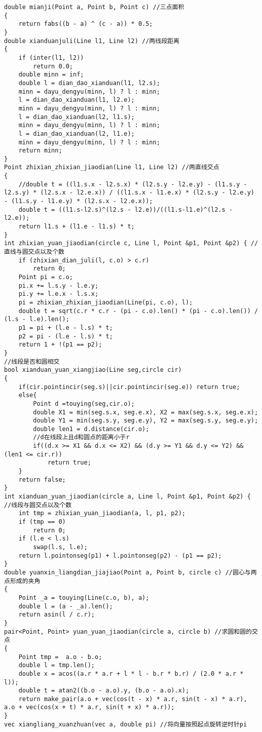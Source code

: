 \begin{lstlisting}
double mianji(Point a, Point b, Point c) //三点面积
{
	return fabs((b - a) ^ (c - a)) * 0.5;
}
double xianduanjuli(Line l1, Line l2) //两线段距离
{
	if (inter(l1, l2))
		return 0.0;
	double minn = inf;
	double l = dian_dao_xianduan(l1, l2.s);
	minn = dayu_dengyu(minn, l) ? l : minn;
	l = dian_dao_xianduan(l1, l2.e);
	minn = dayu_dengyu(minn, l) ? l : minn;
	l = dian_dao_xianduan(l2, l1.s);
	minn = dayu_dengyu(minn, l) ? l : minn;
	l = dian_dao_xianduan(l2, l1.e);
	minn = dayu_dengyu(minn, l) ? l : minn;
	return minn;
}
Point zhixian_zhixian_jiaodian(Line l1, Line l2) //两直线交点
{
	//double t = ((l1.s.x - l2.s.x) * (l2.s.y - l2.e.y) - (l1.s.y - l2.s.y) * (l2.s.x - l2.e.x)) / ((l1.s.x - l1.e.x) * (l2.s.y - l2.e.y) - (l1.s.y - l1.e.y) * (l2.s.x - l2.e.x));
	double t = ((l1.s-l2.s)^(l2.s - l2.e))/((l1.s-l1.e)^(l2.s - l2.e));
	return l1.s + (l1.e - l1.s) * t;
}
int zhixian_yuan_jiaodian(circle c, Line l, Point &p1, Point &p2) { //直线与圆交点以及个数
	if (zhixian_dian_juli(l, c.o) > c.r)
		return 0;
	Point pi = c.o;
	pi.x += l.s.y - l.e.y;
	pi.y += l.e.x - l.s.x;
	pi = zhixian_zhixian_jiaodian(Line(pi, c.o), l);
	double t = sqrt(c.r * c.r - (pi - c.o).len() * (pi - c.o).len()) / (l.s - l.e).len();
	p1 = pi + (l.e - l.s) * t;
	p2 = pi - (l.e - l.s) * t;
	return 1 + !(p1 == p2);
}
//线段是否和圆相交
bool xianduan_yuan_xiangjiao(Line seg,circle cir)
{
	if(cir.pointincir(seg.s)||cir.pointincir(seg.e)) return true;
	else{
		Point d =touying(seg,cir.o);
		double X1 = min(seg.s.x, seg.e.x), X2 = max(seg.s.x, seg.e.x);
		double Y1 = min(seg.s.y, seg.e.y), Y2 = max(seg.s.y, seg.e.y);
		double len1 = d.distance(cir.o);
		//d在线段上且d和圆点的距离小于r
		if((d.x >= X1 && d.x <= X2) && (d.y >= Y1 && d.y <= Y2) && (len1 <= cir.r))
			return true;
	}
	return false;
}
int xianduan_yuan_jiaodian(circle a, Line l, Point &p1, Point &p2) { //线段与圆交点以及个数
	int tmp = zhixian_yuan_jiaodian(a, l, p1, p2);
	if (tmp == 0)
		return 0;
	if (l.e < l.s)
		swap(l.s, l.e);
	return l.pointonseg(p1) + l.pointonseg(p2) - (p1 == p2);
}
double yuanxin_liangdian_jiajiao(Point a, Point b, circle c) //圆心与两点形成的夹角
{
	Point _a = touying(Line(c.o, b), a);
	double l = (a - _a).len();
	return asin(l / c.r);
}
pair<Point, Point> yuan_yuan_jiaodian(circle a, circle b) //求圆和圆的交点
{
	Point tmp =  a.o - b.o;
	double l = tmp.len();
	double x = acos((a.r * a.r + l * l - b.r * b.r) / (2.0 * a.r * l));
	double t = atan2((b.o - a.o).y, (b.o - a.o).x);
	return make_pair(a.o + vec(cos(t - x) * a.r, sin(t - x) * a.r), a.o + vec(cos(x + t) * a.r, sin(t + x) * a.r));
}
vec xiangliang_xuanzhuan(vec a, double pi) //将向量按照起点旋转逆时针pi

\end{lstlisting}
